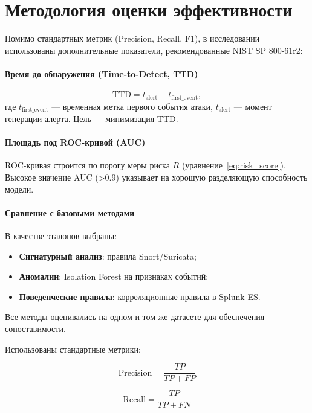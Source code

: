 \section{Методология оценки эффективности}\label{sec:ch4/sect3}

Помимо стандартных метрик (Precision, Recall, F1), в исследовании использованы дополнительные показатели, рекомендованные NIST SP 800-61r2:

\paragraph{Время до обнаружения (Time-to-Detect, TTD)}
\[
\text{TTD} = t_{\text{alert}} - t_{\text{first\_event}},
\]
где $t_{\text{first\_event}}$ — временная метка первого события атаки, $t_{\text{alert}}$ — момент генерации алерта. Цель — минимизация TTD.

\paragraph{Площадь под ROC-кривой (AUC)}
ROC-кривая строится по порогу меры риска $R$ (уравнение~\ref{eq:risk_score}). Высокое значение AUC (>0.9) указывает на хорошую разделяющую способность модели.

\paragraph{Сравнение с базовыми методами}
В качестве эталонов выбраны:
\begin{itemize}
    \item \textbf{Сигнатурный анализ}: правила Snort/Suricata;
    \item \textbf{Аномалии}: Isolation Forest на признаках событий;
    \item \textbf{Поведенческие правила}: корреляционные правила в Splunk ES.
\end{itemize}

Все методы оценивались на одном и том же датасете для обеспечения сопоставимости.

Использованы стандартные метрики:

\begin{equation}
    \text{Precision} = \frac{TP}{TP + FP}
    \label{eq:precision}
\end{equation}

\begin{equation}
    \text{Recall} = \frac{TP}{TP + FN}
    \label{eq:recall}
\end{equation}

